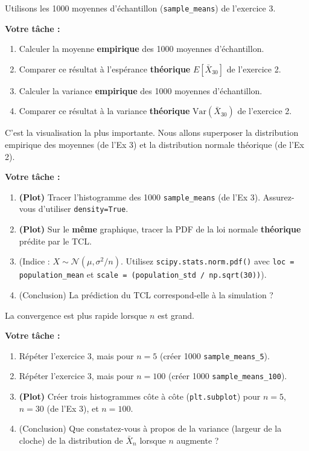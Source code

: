 \begin{exercicebox}
Utilisons les 1000 moyennes d'échantillon (\texttt{sample\_means}) de l'exercice 3.

\textbf{Votre tâche :}
\begin{enumerate}
    \item Calculer la moyenne \textbf{empirique} des 1000 moyennes d'échantillon.
    \item Comparer ce résultat à l'espérance \textbf{théorique} $E[\bar{X}_{30}]$ de l'exercice 2.
    \item Calculer la variance \textbf{empirique} des 1000 moyennes d'échantillon.
    \item Comparer ce résultat à la variance \textbf{théorique} $\text{Var}(\bar{X}_{30})$ de l'exercice 2.
\end{enumerate}
\end{exercicebox}

\begin{exercicebox}
C'est la visualisation la plus importante. Nous allons superposer la distribution empirique des moyennes (de l'Ex 3) et la distribution normale théorique (de l'Ex 2).

\textbf{Votre tâche :}
\begin{enumerate}
    \item \textbf{(Plot)} Tracer l'histogramme des 1000 \texttt{sample\_means} (de l'Ex 3). Assurez-vous d'utiliser \texttt{density=True}.
    \item \textbf{(Plot)} Sur le \textbf{même} graphique, tracer la PDF de la loi normale \textbf{théorique} prédite par le TCL.
    \item (Indice : $X \sim \mathcal{N}(\mu, \sigma^2/n)$. Utilisez \texttt{scipy.stats.norm.pdf()} avec \texttt{loc = population\_mean} et \texttt{scale = (population\_std / np.sqrt(30))}).
    \item (Conclusion) La prédiction du TCL correspond-elle à la simulation ?
\end{enumerate}
\end{exercicebox}

\begin{exercicebox}
La convergence est plus rapide lorsque $n$ est grand.

\textbf{Votre tâche :}
\begin{enumerate}
    \item Répéter l'exercice 3, mais pour $n=5$ (créer 1000 \texttt{sample\_means\_5}).
    \item Répéter l'exercice 3, mais pour $n=100$ (créer 1000 \texttt{sample\_means\_100}).
    \item \textbf{(Plot)} Créer trois histogrammes côte à côte (\texttt{plt.subplot}) pour $n=5$, $n=30$ (de l'Ex 3), et $n=100$.
    \item (Conclusion) Que constatez-vous à propos de la variance (largeur de la cloche) de la distribution de $\bar{X}_n$ lorsque $n$ augmente ?
\end{enumerate}
\end{exercicebox}

